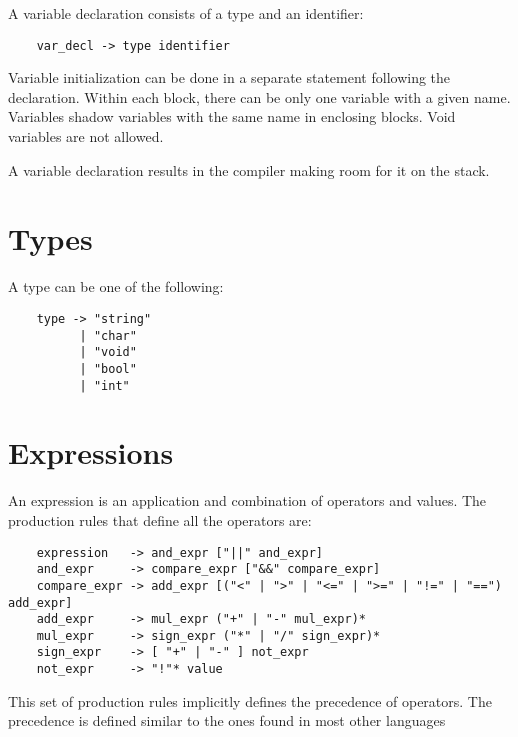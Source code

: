 \documentclass{report}
\begin{document}
A variable declaration consists of a type and an identifier:
\begin{verbatim}
    var_decl -> type identifier
\end{verbatim}

Variable initialization can be done in a separate statement
following the declaration. Within each block, there can be only one
variable with a given name. Variables shadow variables with the same
name in enclosing blocks. Void variables are not allowed.

A variable declaration results in the compiler making room for it on
the stack.

\section{Types}

A type can be one of the following:
\begin{verbatim}
    type -> "string"
          | "char"
          | "void"
          | "bool"
          | "int"
\end{verbatim}

\section{Expressions}

An expression is an application and combination of operators and
values. The production rules that define all the operators are:

\begin{verbatim}
    expression   -> and_expr ["||" and_expr]
    and_expr     -> compare_expr ["&&" compare_expr]
    compare_expr -> add_expr [("<" | ">" | "<=" | ">=" | "!=" | "==") add_expr]
    add_expr     -> mul_expr ("+" | "-" mul_expr)*
    mul_expr     -> sign_expr ("*" | "/" sign_expr)*
    sign_expr    -> [ "+" | "-" ] not_expr
    not_expr     -> "!"* value
\end{verbatim}

This set of production rules implicitly defines the precedence of
operators. The precedence is defined similar to the ones found in
most other languages
\end{document}
